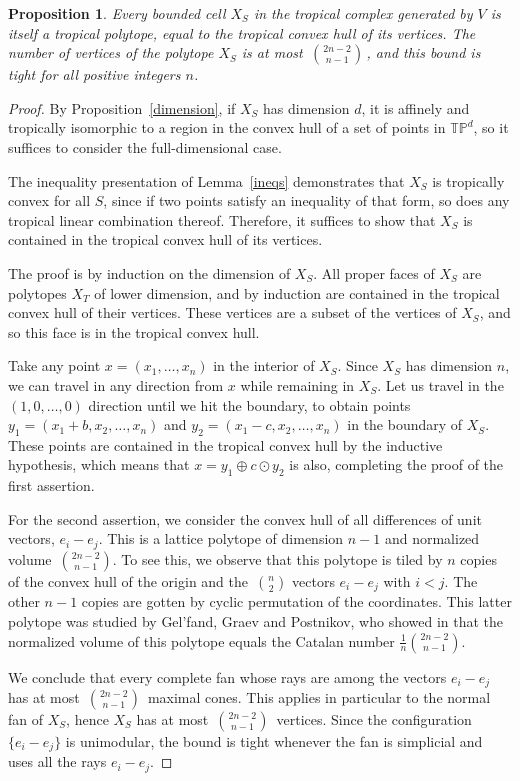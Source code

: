 \documentclass[11pt]{amsart}
\newtheorem{prop}[thm]{Proposition}
\newcommand{\TP}{\mathbb{TP}}
\begin{document}
\begin{prop}\label{regconvex} 
Every
bounded cell $X_S$ in the tropical complex generated by $V$ is itself a tropical polytope,
equal to the tropical convex hull of its vertices. 
The number of vertices of the polytope $X_S$ is at most $\, \binom{2n-2}{n-1}\,  $,
and this bound is tight for all positive integers $n$.
\end{prop}

\begin{proof}
By Proposition~\ref{dimension}, if $X_S$ has dimension $d$, it is affinely and tropically
isomorphic to a region in the convex hull of a set of points in $\TP^{d}$, so it suffices to 
consider the full-dimensional case.

The inequality presentation of Lemma~\ref{ineqs} demonstrates that $X_S$ is tropically convex for 
all $S$, since if two points satisfy an inequality of that form, so does 
any tropical linear combination 
thereof. Therefore, it suffices to show that $X_S$ is contained in the tropical convex hull of its 
vertices.

The proof is by induction on the dimension of $X_S$. All proper faces of $X_S$ are 
polytopes
$X_T$ of lower dimension, and by induction are contained in the tropical convex hull of their 
vertices. These vertices are a subset of the vertices of $X_S$, and so this face is
in the tropical convex hull.

Take any point $x=(x_1,\ldots,x_n)$ in the interior of $X_S$. Since $X_S$ has dimension
$n$, we can travel in any direction from $x$ while remaining in $X_S$. Let us travel in the
$(1,0,\ldots,0)$ direction until we hit the boundary, to obtain points
$y_1=(x_1+b,x_2,\ldots,x_n)$ and $y_2=(x_1-c,x_2,\ldots,x_n)$ in the boundary of $X_S$. These
points are contained in the tropical convex hull by the inductive hypothesis, which means that $x
= y_1\oplus c\odot y_2$ is also, completing the proof of the first assertion.

For the second assertion, we consider the convex hull
of all differences of unit vectors, $e_i - e_j$. This is a lattice polytope
of dimension $n-1$ and normalized volume $\,\binom{2n-2}{n-1}$. To see this, we observe that this polytope is tiled
by $n$ copies of the convex hull of the origin and 
the $\,\binom{n}{2}$ vectors $e_i-e_j$ with $i<j$. 
The other $n-1$ copies are gotten by
 cyclic permutation of the coordinates.
This latter polytope was studied by
Gel'fand, Graev and Postnikov, who showed in \cite[Theorem 2.3 (2)]{GGP} that the normalized volume of this polytope 
equals the Catalan number $\frac{1}{n} \binom{2n-2}{n-1}$.

We conclude that every complete fan whose rays are among the
vectors $e_i - e_j$ has at most $\, \binom{2n-2}{n-1}  \,$ maximal cones.
This applies in particular to the normal fan of $X_S$, 
hence $X_S$ has at most $\, \binom{2n-2}{n-1}  \,$ vertices.
Since the configuration $\{e_i-e_j\}$ is unimodular,
the bound is tight whenever the fan is simplicial and uses all the
rays $e_i-e_j$.
\end{proof}
\end{document}
